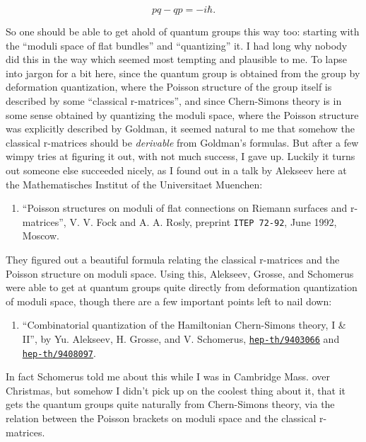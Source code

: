 \documentclass{article}
\def\tightlist{}
\begin{document}
\[pq - qp = -i \hbar.\]

So one should be able to get ahold of quantum groups this way too:
starting with the ``moduli space of flat bundles'' and ``quantizing''
it. I had long why nobody did this in the way which seemed most tempting
and plausible to me. To lapse into jargon for a bit here, since the
quantum group is obtained from the group by deformation quantization,
where the Poisson structure of the group itself is described by some
``classical r-matrices'', and since Chern-Simons theory is in some sense
obtained by quantizing the moduli space, where the Poisson structure was
explicitly described by Goldman, it seemed natural to me that somehow
the classical r-matrices should be \emph{derivable} from Goldman's
formulas. But after a few wimpy tries at figuring it out, with not much
success, I gave up. Luckily it turns out someone else succeeded nicely,
as I found out in a talk by Alekseev here at the Mathematisches Institut
of the Universitaet Muenchen:

\begin{enumerate}
\def\labelenumi{\arabic{enumi})}
\setcounter{enumi}{3}
\tightlist
\item
  ``Poisson structures on moduli of flat connections on Riemann surfaces
  and r-matrices'', V. V. Fock and A. A. Rosly, preprint
  \texttt{ITEP\ 72-92}, June 1992, Moscow.
\end{enumerate}

They figured out a beautiful formula relating the classical r-matrices
and the Poisson structure on moduli space. Using this, Alekseev, Grosse,
and Schomerus were able to get at quantum groups quite directly from
deformation quantization of moduli space, though there are a few
important points left to nail down:

\begin{enumerate}
\def\labelenumi{\arabic{enumi})}
\setcounter{enumi}{4}
\tightlist
\item
  ``Combinatorial quantization of the Hamiltonian Chern-Simons theory, I
  \& II'', by Yu. Alekseev, H. Grosse, and V. Schomerus,
  \href{http://xxx.lanl.gov/abs/hep-th/9403066}{\texttt{hep-th/9403066}}
  and
  \href{http://xxx.lanl.gov/abs/hep-th/9408097}{\texttt{hep-th/9408097}}.
\end{enumerate}

In fact Schomerus told me about this while I was in Cambridge Mass. over
Christmas, but somehow I didn't pick up on the coolest thing about it,
that it gets the quantum groups quite naturally from Chern-Simons
theory, via the relation between the Poisson brackets on moduli space
and the classical r-matrices.
\end{document}
